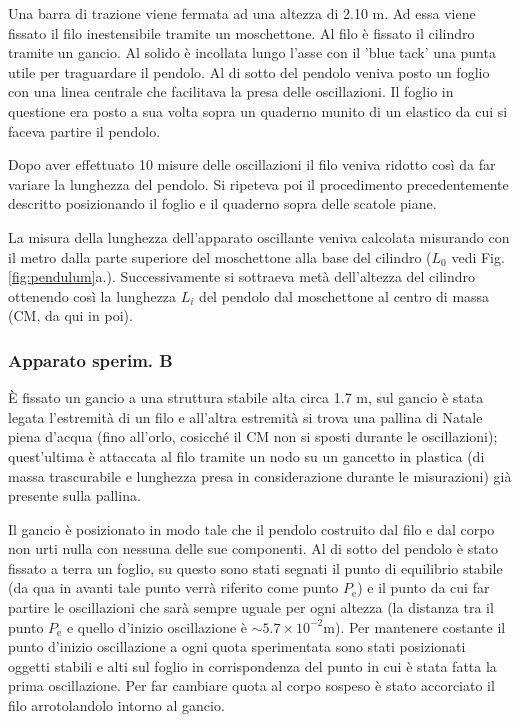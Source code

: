 \documentclass[italian, a4paper, 10pt, twocolumn]{../../style/lab_unige}
\newcommand{\reffig}[1]{Fig. {\ref{#1}}}%
\begin{document}
  Una barra di trazione viene fermata ad una altezza di 2.10 m. Ad essa viene fissato il filo inestensibile 
  tramite un moschettone. Al filo è fissato il cilindro tramite un gancio. Al solido è incollata lungo 
  l’asse con il  'blue tack' una punta utile per traguardare il pendolo. Al di sotto del pendolo veniva 
  posto un foglio con una linea centrale che facilitava la presa delle oscillazioni. Il foglio in questione 
  era posto a sua volta sopra un quaderno munito di un elastico da cui si faceva partire il pendolo. 

  Dopo aver effettuato 10 misure delle oscillazioni il filo veniva ridotto così da far variare la lunghezza
   del pendolo. Si ripeteva poi il procedimento precedentemente descritto posizionando il 
  foglio e il quaderno sopra delle scatole piane. 

  La misura della lunghezza dell’apparato oscillante veniva calcolata misurando con il metro dalla parte 
  superiore del moschettone alla base del cilindro ($L_{0}$ vedi \reffig{fig:pendulum}a.). 
  Successivamente si sottraeva metà dell’altezza del cilindro ottenendo così la lunghezza $L_{i}$ del pendolo
  dal moschettone al centro di massa (CM, da qui in poi). 

  \subsubsection{Apparato sperim. B} %
  È fissato un gancio a una struttura stabile alta circa 1.7 m, sul gancio è stata legata l’estremità di 
  un filo e all’altra estremità si trova una pallina di Natale piena d’acqua (fino all’orlo, cosicché il 
  CM non si sposti durante le oscillazioni); quest’ultima è attaccata al filo tramite un nodo su un gancetto
  in plastica (di massa trascurabile e lunghezza presa in considerazione durante le misurazioni) già 
  presente sulla pallina. 
  
  Il gancio è posizionato in modo tale che il pendolo costruito 
  dal filo e dal corpo non urti nulla con nessuna delle sue componenti. Al di sotto del pendolo è stato 
  fissato a terra un foglio, su questo sono stati segnati il punto di equilibrio stabile (da qua in avanti 
  tale punto verrà riferito come punto $P_{\text{e}}$) e il punto da cui far partire le oscillazioni che 
  sarà sempre uguale per ogni altezza (la distanza tra il punto $P_{\text{e}}$ e quello d'inizio 
  oscillazione è $\sim5.7\times10^{-2}$m). Per mantenere costante il punto d'inizio oscillazione a ogni 
  quota sperimentata sono stati posizionati oggetti stabili e alti sul foglio in corrispondenza del punto 
  in cui è stata fatta la prima oscillazione. Per far cambiare quota al corpo sospeso è stato accorciato il 
  filo arrotolandolo intorno al gancio. 
  
\end{document}
